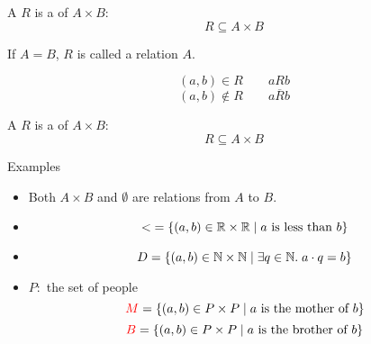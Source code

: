 
\begin{frame}{}
  \begin{definition}[关系 (Relations)]
    A  $R$ 
    is a  of $A \times B$:
    \[
      {R \subseteq A \times B}
    \]
  \end{definition}

  \pause
  \vspace{0.30cm}
  \begin{center}
    If $A = B$, $R$ is called a relation  $A$.
  \end{center}

  \pause
  \vspace{0.50cm}
  \begin{definition}[Notations]
    \[
      (a, b) \in R \qquad a R b
    \]
    \[
      (a, b) \notin R \qquad a \overline{R} b
    \]
  \end{definition}
\end{frame}

\begin{frame}{}
  \begin{definition}[Relations]
    A  $R$ 
    is a  of $A \times B$:
    \[
      {R \subseteq A \times B}
    \]
  \end{definition}

  \begin{exampleblock}{Examples}
    \pause
    \begin{itemize}[<+->]
      \item Both $A \times B$ and $\emptyset$ are relations from $A$ to $B$.
      \item
        \[
          <\; = \{(a, b) \in \mathbb{R} \times \mathbb{R} \mid a \text{ is less than } b\}
        \]
      \item
        \[
          D = \{(a, b) \in \mathbb{N} \times \mathbb{N} \mid \exists q \in \mathbb{N}.\; a \cdot q = b\}
        \]
      \item $P:$ the set of people
        \[
          \textcolor{red}{M} = \{(a, b) \in P \times P \mid a \text{ is the mother of } b\}
        \]
        \[
          \textcolor{red}{B} = \{(a, b) \in P \times P \mid a \text{ is the brother of } b\}
        \]
    \end{itemize}
  \end{exampleblock}
\end{frame}

